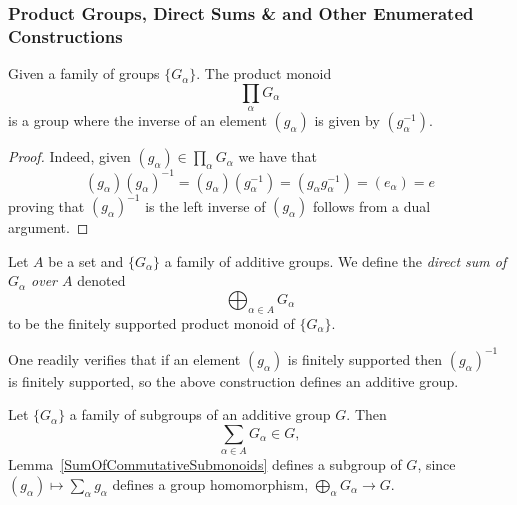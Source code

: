 \subsubsection{Product Groups, Direct Sums \& and Other Enumerated Constructions}
\begin{lemma}
    Given a family of groups $\{G_\alpha\}$. The product monoid 
    $$
        \prod_{\alpha} G_\alpha
    $$
    is a group where the inverse of an element $(g_\alpha)$ is given by $(g_\alpha^{-1})$.
\end{lemma}
\begin{proof}
    Indeed, given $(g_\alpha)\in \prod_{\alpha} G_\alpha$ we have that
    $$
        (g_\alpha)(g_\alpha)^{-1} = (g_\alpha)(g_\alpha^{-1}) = (g_\alpha g_\alpha^{-1}) = (e_\alpha) = e
    $$
    proving that $(g_\alpha)^{-1}$ is the left inverse of $(g_\alpha)$ follows from a dual argument.
\end{proof}
\begin{definition}
    Let $A$ be a set and $\{G_\alpha\}$ a family of additive groups. We define the \textit{direct sum of $G_\alpha$ over $A$} denoted
    $$\bigoplus_{\alpha\in A} G_\alpha$$
    to be the finitely supported product monoid of $\{G_\alpha\}$.
\end{definition}
One readily verifies that if an element $(g_\alpha)$ is finitely supported then $(g_{\alpha})^{-1}$ is finitely supported, so the above construction defines an additive group.  
\begin{remark}\label{SumsOfInfinitelyOftenZeroGroupElements}
    Let $\{G_\alpha\}$ a family of subgroups of an additive group $G$. Then 
    $$\sum_{\alpha\in A} G_\alpha \in G,$$ Lemma~\ref{SumOfCommutativeSubmonoids} defines a subgroup of $G$, since $(g_\alpha)\mapsto \sum_\alpha g_\alpha$ defines a group homomorphism, $\bigoplus_{\alpha} G_\alpha\rightarrow G$. 
\end{remark}
